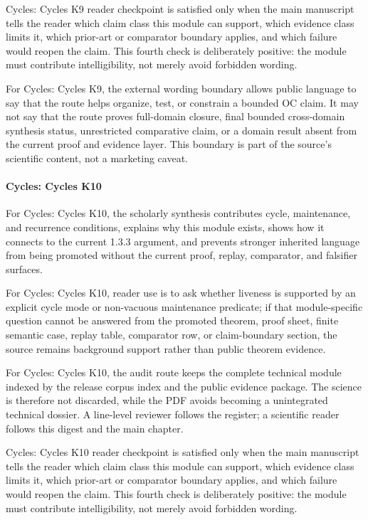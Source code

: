 Cycles: Cycles K9 reader checkpoint is satisfied only when the main manuscript tells the reader which claim class this module can support, which evidence class limits it, which prior-art or comparator boundary applies, and which failure would reopen the claim. This fourth check is deliberately positive: the module must contribute intelligibility, not merely avoid forbidden wording.


For Cycles: Cycles K9, the external wording boundary allows public language to say that the route helps organize, test, or constrain a bounded OC claim. It may not say that the route proves full-domain closure, final bounded cross-domain synthesis status, unrestricted comparative claim, or a domain result absent from the current proof and evidence layer. This boundary is part of the source's scientific content, not a marketing caveat.


\paragraph{Cycles: Cycles K10}

For Cycles: Cycles K10, the scholarly synthesis contributes cycle, maintenance, and recurrence conditions, explains why this module exists, shows how it connects to the current 1.3.3 argument, and prevents stronger inherited language from being promoted without the current proof, replay, comparator, and falsifier surfaces.


For Cycles: Cycles K10, reader use is to ask whether liveness is supported by an explicit cycle mode or non-vacuous maintenance predicate; if that module-specific question cannot be answered from the promoted theorem, proof sheet, finite semantic case, replay table, comparator row, or claim-boundary section, the source remains background support rather than public theorem evidence.


For Cycles: Cycles K10, the audit route keeps the complete technical module indexed by the release corpus index and the public evidence package. The science is therefore not discarded, while the PDF avoids becoming a unintegrated technical dossier. A line-level reviewer follows the register; a scientific reader follows this digest and the main chapter.


Cycles: Cycles K10 reader checkpoint is satisfied only when the main manuscript tells the reader which claim class this module can support, which evidence class limits it, which prior-art or comparator boundary applies, and which failure would reopen the claim. This fourth check is deliberately positive: the module must contribute intelligibility, not merely avoid forbidden wording.


